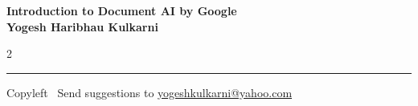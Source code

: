 \documentclass[8pt,landscape]{article}
\begin{document}
\footnotesize


\begin{center}
\Large{\textbf{Introduction to Document AI by Google\\ Yogesh Haribhau Kulkarni}}  
\end{center}

\begin{multicols}{2}

\end{multicols}

\rule{\linewidth}{0.25pt}
\scriptsize
Copyleft \textcopyleft\  Send suggestions to 
\href{http://www.yogeshkulkarni.com}{yogeshkulkarni@yahoo.com}
\end{document}
